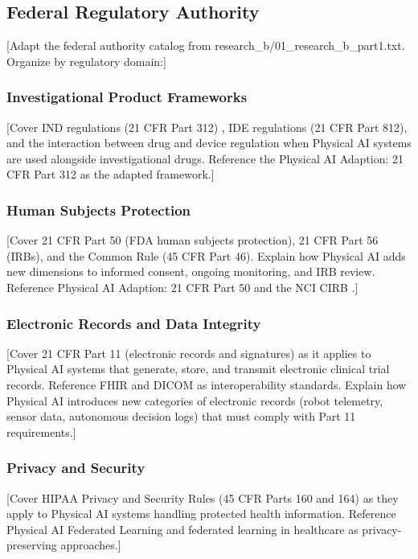 \subsection{Federal Regulatory Authority}
\label{subsec:federal-authority}

[Adapt the federal authority catalog from research\_b/01\_research\_b\_part1.txt.
Organize by regulatory domain:]

\subsubsection{Investigational Product Frameworks}
[Cover IND regulations (21 CFR Part 312) \cite{cfr-part-312}, IDE regulations
(21 CFR Part 812), and the interaction between drug and device regulation when
Physical AI systems are used alongside investigational drugs. Reference the
Physical AI Adaption: 21 CFR Part 312 \cite{cfr312-adapt} as the adapted
framework.]

\subsubsection{Human Subjects Protection}
[Cover 21 CFR Part 50 \cite{cfr-part-50} (FDA human subjects protection),
21 CFR Part 56 (IRBs), and the Common Rule (45 CFR Part 46). Explain how
Physical AI adds new dimensions to informed consent, ongoing monitoring, and
IRB review. Reference Physical AI Adaption: 21 CFR Part 50 \cite{cfr50-adapt}
and the NCI CIRB \cite{nci-cirb}.]

\subsubsection{Electronic Records and Data Integrity}
[Cover 21 CFR Part 11 (electronic records and signatures) as it applies to
Physical AI systems that generate, store, and transmit electronic clinical
trial records. Reference FHIR \cite{hl7-fhir} and DICOM \cite{dicom} as
interoperability standards. Explain how Physical AI introduces new categories
of electronic records (robot telemetry, sensor data, autonomous decision logs)
that must comply with Part 11 requirements.]

\subsubsection{Privacy and Security}
[Cover HIPAA Privacy and Security Rules (45 CFR Parts 160 and 164)
\cite{hipaa} as they apply to Physical AI systems handling protected health
information. Reference Physical AI Federated Learning \cite{fl-paper} and
federated learning in healthcare \cite{federated-learning-healthcare} as
privacy-preserving approaches.]

